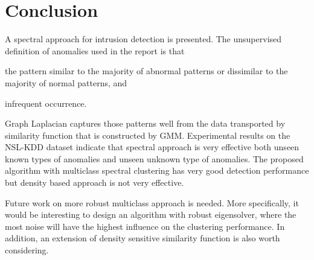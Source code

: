 \section{Conclusion}
\label{sec:conclusion}
A spectral approach for intrusion detection is presented. 
The unsupervised definition of anomalies used in the report is that 
\begin{inparaenum}
\item the pattern similar to the majority of abnormal patterns or dissimilar to the majority of normal patterns, and
\item infrequent occurrence.
\end{inparaenum}
Graph Laplacian captures those patterns well from the data transported by similarity function that is constructed by GMM. 
Experimental results on the NSL-KDD dataset indicate that spectral approach is very effective both unseen known types of anomalies and unseen unknown type of anomalies. 
The proposed algorithm with multiclass spectral clustering has very good detection performance but density based approach is not very effective. 

Future work on more robust multiclass approach is needed. 
More specifically, it would be interesting to design an algorithm with robust eigensolver, where the most noise will have the highest influence on the clustering performance. 
In addition, an extension of density sensitive similarity function is also worth considering. 
